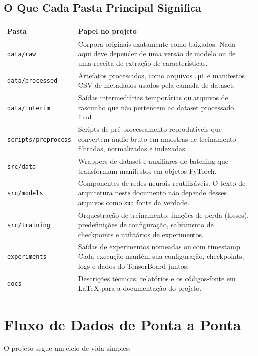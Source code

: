 \documentclass[11pt]{article}
\newcommand{\pathtt}[1]{\texttt{#1}}
\begin{document}
\subsection{O Que Cada Pasta Principal Significa}

\begin{longtable}{>{\raggedright\arraybackslash}p{} >{\raggedright\arraybackslash}p{}}
\toprule
\textbf{Pasta} & \textbf{Papel no projeto} \\
\midrule
\pathtt{data/raw} & Corpora originais exatamente como baixados. Nada aqui deve depender de uma versão de modelo ou de uma receita de extração de características. \\
\pathtt{data/processed} & Artefatos processados, como arquivos \pathtt{.pt} e manifestos CSV de metadados usados pela camada de dataset. \\
\pathtt{data/interim} & Saídas intermediárias temporárias ou arquivos de rascunho que não pertencem ao dataset processado final. \\
\pathtt{scripts/preprocess} & Scripts de pré-processamento reprodutíveis que convertem áudio bruto em amostras de treinamento filtradas, normalizadas e indexadas. \\
\pathtt{src/data} & Wrappers de dataset e auxiliares de batching que transformam manifestos em objetos PyTorch. \\
\pathtt{src/models} & Componentes de redes neurais reutilizáveis. O texto de arquitetura neste documento não depende desses arquivos como sua fonte da verdade. \\
\pathtt{src/training} & Orquestração de treinamento, funções de perda (losses), predefinições de configuração, salvamento de checkpoints e utilitários de experimentos. \\
\pathtt{experiments} & Saídas de experimentos nomeadas ou com timestamp. Cada execução mantém sua configuração, checkpoints, logs e dados do TensorBoard juntos. \\
\pathtt{docs} & Descrições técnicas, relatórios e os códigos-fonte em LaTeX para a documentação do projeto. \\
\bottomrule
\end{longtable}

\section{Fluxo de Dados de Ponta a Ponta}

O projeto segue um ciclo de vida simples:
\end{document}
